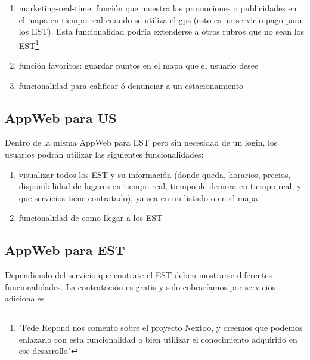 \documentclass[spanish, DIV=calc, paper=a4, fontsize=11pt, twocolumn]{scrartcl}	 %
\begin{document}
\begin{enumerate}
\begin{enumerate}
			\item marketing-real-time: función que muestra las promociones o publicidades en el mapa en tiempo real cuando se utiliza el gps (esto es un servicio pago para los EST). Esta funcionalidad podría extenderse a otros rubros que no sean los EST\footnote[1]{"Fede Repond nos comento sobre el proyecto Nextoo, y creemos que podemos enlazarlo con esta funcionalidad o bien utilizar el conocimiento adquirido en ese desarrollo"}

			\item función favoritos: guardar puntos en el mapa que el usuario desee

			\item funcionalidad para calificar ó denunciar a un estacionamiento

		\end{enumerate}

\end{enumerate}

\subsection{AppWeb para US}
Dentro de la misma AppWeb para EST pero sin necesidad de un login, los usuarios podrán utilizar las siguientes funcionalidades:

\begin{enumerate}
	
	\item visualizar todos los EST y su información (donde queda, horarios, precios, disponibilidad de lugares en tiempo real, tiempo de demora en tiempo real, y que servicios tiene contratado), ya sea en un listado o en el mapa.

	\item funcionalidad de como llegar a los EST

\end{enumerate}

\subsection{AppWeb para EST}
Dependiendo del servicio que contrate el EST deben mostrarse diferentes funcionalidades. La contratación es gratis y solo cobraríamos por servicios adicionales	
\end{document}
